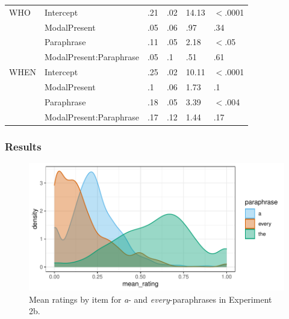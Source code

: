 \documentclass[12pt,letterpaper,table,svgnames,dvipsnames]{article}
\begin{document}
\begin{table}
\begin{center}
\begin{tabular}{l|lllll}
\midrule
WHO & Intercept & .21 & .02 & 14.13 & $<$.0001\\
{} & ModalPresent & .05 & .06 & .97 & .34\\
{} & Paraphrase & .11 & .05 & 2.18 & $<$.05\\
{} & ModalPresent:Paraphrase & .05 & .1 & .51 & .61\\
\midrule
WHEN & Intercept & .25 & .02 & 10.11 & $<$.0001\\
{} & ModalPresent & .1 & .06 & 1.73 & .1\\
{} & Paraphrase & .18 & .05 & 3.39 & $<$.004\\
{} & ModalPresent:Paraphrase & .17 & .12 & 1.44 & .17\\
\bottomrule
\end{tabular} 
\end{center} 
\end{table}



\subsubsection{Results}


\begin{figure}[h!]
\centering
\includegraphics[scale=1]{figures/ex2b_denisty_mean_ratings.pdf}
\caption{Mean ratings by item for \emph{a}- and \emph{every}-paraphrases in Experiment 2b.}
\label{ex2b_density_mr}
\end{figure}

\end{document}
